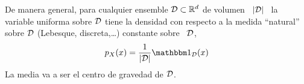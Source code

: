 De manera  general, para  cualquier ensemble $\mathcal{D}  \subset \mathbb{R}^d$ de  volumen \
$|\mathcal{D}|$ \,  la variable uniforma sobre $\mathcal{D}$  tiene la densidad con  respecto a la
medida  ``natural'' sobre  $\mathcal{D}$  (Lebesque, discreta,\ldots)  constante sobre  \
$\mathcal{D}$,
%
\[
p_X(x) = \frac{1}{|\D|} \un_{\D}(x)
\]
%
La media va a ser el centro de gravedad de $\mathcal{D}$.







